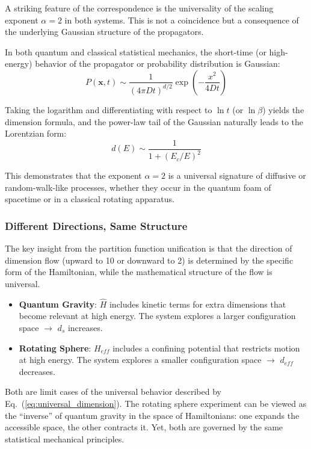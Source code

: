 \documentclass[UTF8]{ctex}\n\documentclass[12pt,a4paper]{article}
\begin{document}
A striking feature of the correspondence is the universality of the scaling exponent $\alpha = 2$ in both systems. This is not a coincidence but a consequence of the underlying Gaussian structure of the propagators.

In both quantum and classical statistical mechanics, the short-time (or high-energy) behavior of the propagator or probability distribution is Gaussian:
\begin{equation}
    P(\mathbf{x}, t) \sim \frac{1}{(4\pi D t)^{d/2}} \exp\left(-\frac{x^2}{4Dt}\right)
\end{equation}

Taking the logarithm and differentiating with respect to $\ln t$ (or $\ln \beta$) yields the dimension formula, and the power-law tail of the Gaussian naturally leads to the Lorentzian form:
\begin{equation}
    d(E) \sim \frac{1}{1+(E_c/E)^2}
\end{equation}

This demonstrates that the exponent $\alpha = 2$ is a universal signature of diffusive or random-walk-like processes, whether they occur in the quantum foam of spacetime or in a classical rotating apparatus.

\subsubsection{Different Directions, Same Structure}

The key insight from the partition function unification is that the direction of dimension flow (upward to 10 or downward to 2) is determined by the specific form of the Hamiltonian, while the mathematical structure of the flow is universal.

\begin{itemize}
    \item \textbf{Quantum Gravity}: $\hat{H}$ includes kinetic terms for extra dimensions that become relevant at high energy. The system explores a larger configuration space $\rightarrow$ $d_s$ increases.
    \item \textbf{Rotating Sphere}: $H_{eff}$ includes a confining potential that restricts motion at high energy. The system explores a smaller configuration space $\rightarrow$ $d_{eff}$ decreases.
\end{itemize}

Both are limit cases of the universal behavior described by Eq.~(\ref{eq:universal_dimension}). The rotating sphere experiment can be viewed as the ``inverse'' of quantum gravity in the space of Hamiltonians: one expands the accessible space, the other contracts it. Yet, both are governed by the same statistical mechanical principles.
\end{document}
